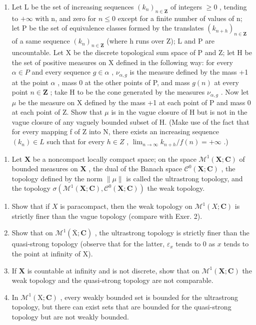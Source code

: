 \begin{enumerate}
\def\labelenumi{\alph{enumi})}
\setcounter{enumi}{1}
\tightlist
\item
  Let L be the set of increasing sequences \((k_{n})_{n\in\mathbf{Z}}\) of integers \(\geqslant0\) , tending to \(+\infty\) with n, and zero for \(n\leqslant0\) except for a finite number of values of n; let P be the set of equivalence classes formed by the translates \((k_{n+h})_{n\in\mathbf{Z}}\) of a same sequence \((k_{n})_{n\in\mathbf{Z}}\) (where h runs over Z); L and P are uncountable. Let X be the discrete topological sum space of P and Z; let H be the set of positive measures on X defined in the following way: for every \(\alpha\in P\) and every sequence \(g\in\alpha\) , \(\nu_{\alpha,g}\) is the measure defined by the mass +1 at the point \(\alpha\) , mass 0 at the other points of P, and mass \(g(n)\) at every point \(n\in\mathbf{Z}\) ; take H to be the cone generated by the measures \(\nu_{\alpha,g}\) . Now let \(\mu\) be the measure on X defined by the mass +1 at each point of P and mass 0 at each point of Z. Show that \(\mu\) is in the vague closure of H but is not in the vague closure of any vaguely bounded subset of H. (Make use of the fact that for every mapping f of Z into N, there exists an increasing sequence \((k_{n})\in L\) such that for every \(h\in Z\) , \(\lim_{n\to\infty}k_{n+h}/f(n)=+\infty\) .)
\end{enumerate}

\begin{enumerate}
\def\labelenumi{\arabic{enumi})}
\setcounter{enumi}{14}
\tightlist
\item
  Let \(\mathbf{X}\) be a noncompact locally compact space; on the space \(\mathcal{M}^1(\mathbf{X};\mathbf{C})\) of bounded measures on \(\mathbf{X}\) , the dual of the Banach space \(\mathcal{C}^0(\mathbf{X};\mathbf{C})\) , the topology defined by the norm \(\| \mu \|\) is called the ultrastrong topology, and the topology \(\sigma (\mathcal{M}^1(\mathbf{X};\mathbf{C}),\mathcal{C}^0(\mathbf{X};\mathbf{C}))\) the weak topology.
\end{enumerate}

\begin{enumerate}
\def\labelenumi{\alph{enumi})}
\item
  Show that if \(X\) is paracompact, then the weak topology on \(\mathcal{M}^1(X; \mathbf{C})\) is strictly finer than the vague topology (compare with Exer. 2).
\item
  Show that on \(\mathcal{M}^1 (\overline{\mathrm{X}};\mathbf{C})\) , the ultrastrong topology is strictly finer than the quasi-strong topology (observe that for the latter, \(\varepsilon_{x}\) tends to 0 as \(x\) tends to the point at infinity of X).
\item
  If \(\mathbf{X}\) is countable at infinity and is not discrete, show that on \(\mathcal{M}^1(\mathbf{X};\mathbf{C})\) the weak topology and the quasi-strong topology are not comparable.
\item
  In \(\mathcal{M}^1 (\mathrm{X};\mathbf{C})\) , every weakly bounded set is bounded for the ultrastrong topology, but there can exist sets that are bounded for the quasi-strong topology but are not weakly bounded.
\end{enumerate}

